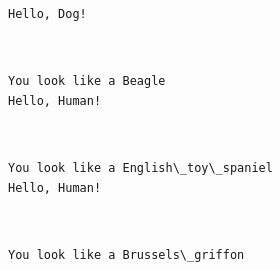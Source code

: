 \documentclass[11pt]{article}
\begin{document}
    \begin{Verbatim}[commandchars=\\\{\}]
Hello, Dog!

    \end{Verbatim}

    \begin{center}
    \end{center}
    { \hspace*{\fill} \\}
    
    \begin{Verbatim}[commandchars=\\\{\}]
You look like a Beagle
Hello, Human!

    \end{Verbatim}

    \begin{center}
    \end{center}
    { \hspace*{\fill} \\}
    
    \begin{Verbatim}[commandchars=\\\{\}]
You look like a English\_toy\_spaniel
Hello, Human!

    \end{Verbatim}

    \begin{center}
    \end{center}
    { \hspace*{\fill} \\}
    
    \begin{Verbatim}[commandchars=\\\{\}]
You look like a Brussels\_griffon

    \end{Verbatim}


    
    
    
    
\end{document}
